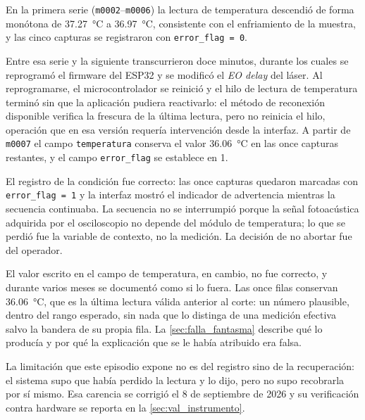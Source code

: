 En la primera serie (\texttt{m0002}--\texttt{m0006}) la lectura de
temperatura descendió de forma monótona de \SI{37.27}{\celsius} a
\SI{36.97}{\celsius}, consistente con el enfriamiento de la muestra, y
las cinco capturas se registraron con \texttt{error\_flag = 0}.

Entre esa serie y la siguiente transcurrieron doce minutos, durante los
cuales se reprogramó el firmware del ESP32 y se modificó el \textit{EO
delay} del láser. Al reprogramarse, el microcontrolador se reinició y el
hilo de lectura de temperatura terminó sin que la aplicación pudiera
reactivarlo: el método de reconexión disponible verifica la frescura de
la última lectura, pero no reinicia el hilo, operación que en esa
versión requería intervención desde la interfaz. A partir de
\texttt{m0007} el campo \texttt{temperatura} conserva el valor
\SI{36.06}{\celsius} en las once capturas restantes, y el campo
\texttt{error\_flag} se establece en 1.

El registro de la condición fue correcto: las once capturas quedaron
marcadas con \texttt{error\_flag = 1} y la interfaz mostró el indicador
de advertencia mientras la secuencia continuaba. La secuencia no se
interrumpió porque la señal fotoacústica adquirida por el osciloscopio
no depende del módulo de temperatura; lo que se perdió fue la variable
de contexto, no la medición. La decisión de no abortar fue del
operador.

El valor escrito en el campo de temperatura, en cambio, no fue
correcto, y durante varios meses se documentó como si lo fuera. Las
once filas conservan \SI{36.06}{\celsius}, que es la última lectura
válida anterior al corte: un número plausible, dentro del rango
esperado, sin nada que lo distinga de una medición efectiva salvo la
bandera de su propia fila. La \cref{sec:falla_fantasma} describe qué lo
producía y por qué la explicación que se le había atribuido era falsa.

La limitación que este episodio expone no es del registro sino de la
recuperación: el sistema supo que había perdido la lectura y lo dijo,
pero no supo recobrarla por sí mismo. Esa carencia se corrigió el 8 de
septiembre de 2026 y su verificación contra hardware se reporta en la
\cref{sec:val_instrumento}.

